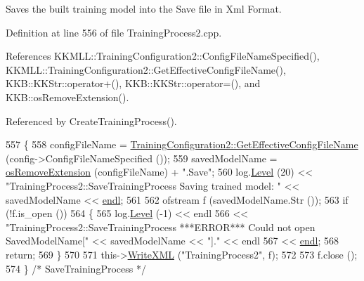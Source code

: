 Saves the built training model into the Save file in Xml Format. 



Definition at line 556 of file Training\+Process2.\+cpp.



References K\+K\+M\+L\+L\+::\+Training\+Configuration2\+::\+Config\+File\+Name\+Specified(), K\+K\+M\+L\+L\+::\+Training\+Configuration2\+::\+Get\+Effective\+Config\+File\+Name(), K\+K\+B\+::\+K\+K\+Str\+::operator+(), K\+K\+B\+::\+K\+K\+Str\+::operator=(), and K\+K\+B\+::os\+Remove\+Extension().



Referenced by Create\+Training\+Process().


\begin{DoxyCode}
557 \{
558   configFileName = \hyperlink{class_k_k_m_l_l_1_1_training_configuration2_a1805f10e0a83f752f0d501de6c11b3c3}{TrainingConfiguration2::GetEffectiveConfigFileName}
       (config->ConfigFileNameSpecified ());
559   savedModelName = \hyperlink{namespace_k_k_b_a13b1a6f4e074969602dbe4bf9022a9c6}{osRemoveExtension} (configFileName) + \textcolor{stringliteral}{".Save"};
560   log.\hyperlink{class_k_k_b_1_1_run_log_a32cf761d7f2e747465fd80533fdbb659}{Level} (20) << \textcolor{stringliteral}{"TrainingProcess2::SaveTrainingProcess  Saving trained model: "} << savedModelName 
      << \hyperlink{namespace_k_k_b_ad1f50f65af6adc8fa9e6f62d007818a8}{endl};
561 
562   ofstream f (savedModelName.Str ());
563   \textcolor{keywordflow}{if}  (!f.is\_open ())
564   \{
565     log.\hyperlink{class_k_k_b_1_1_run_log_a32cf761d7f2e747465fd80533fdbb659}{Level} (-1) << endl
566       << \textcolor{stringliteral}{"TrainingProcess2::SaveTrainingProcess   ***ERROR***   Could not open SavedModelName["} << 
      savedModelName << \textcolor{stringliteral}{"]."} << endl
567       << \hyperlink{namespace_k_k_b_ad1f50f65af6adc8fa9e6f62d007818a8}{endl};
568     \textcolor{keywordflow}{return};
569   \}
570 
571   this->\hyperlink{class_k_k_m_l_l_1_1_training_process2_a35cf9c0ab759e95b140b253b4db53c3b}{WriteXML} (\textcolor{stringliteral}{"TrainingProcess2"}, f);
572 
573   f.close ();
574 \}  \textcolor{comment}{/* SaveTrainingProcess */}
\end{DoxyCode}
